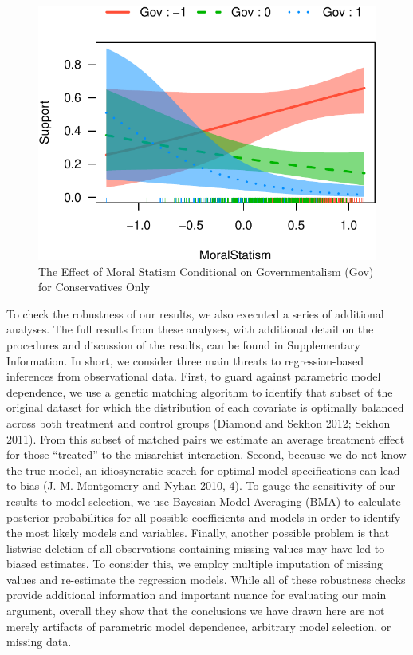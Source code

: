 \documentclass[12pt,]{article}
\begin{document}
\begin{figure}[htbp]
\centering
\includegraphics{figures/effect-plot2-1.pdf}
\caption{The Effect of Moral Statism Conditional on Governmentalism
(Gov) for Conservatives Only}
\end{figure}

To check the robustness of our results, we also executed a series of
additional analyses. The full results from these analyses, with
additional detail on the procedures and discussion of the results, can
be found in Supplementary Information. In short, we consider three main
threats to regression-based inferences from observational data. First,
to guard against parametric model dependence, we use a genetic matching
algorithm to identify that subset of the original dataset for which the
distribution of each covariate is optimally balanced across both
treatment and control groups (Diamond and Sekhon 2012; Sekhon 2011).
From this subset of matched pairs we estimate an average treatment
effect for those ``treated'' to the misarchist interaction. Second,
because we do not know the true model, an idiosyncratic search for
optimal model specifications can lead to bias (J. M. Montgomery and
Nyhan 2010, 4). To gauge the sensitivity of our results to model
selection, we use Bayesian Model Averaging (BMA) to calculate posterior
probabilities for all possible coefficients and models in order to
identify the most likely models and variables. Finally, another possible
problem is that listwise deletion of all observations containing missing
values may have led to biased estimates. To consider this, we employ
multiple imputation of missing values and re-estimate the regression
models. While all of these robustness checks provide additional
information and important nuance for evaluating our main argument,
overall they show that the conclusions we have drawn here are not merely
artifacts of parametric model dependence, arbitrary model selection, or
missing data.
\end{document}

